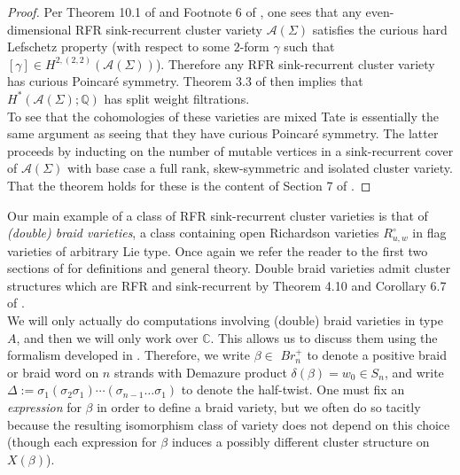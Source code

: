\documentclass[11pt]{amsart}
\theoremstyle{definition}
\theoremstyle{remark}
\numberwithin{equation}{section}
\begin{document}
\begin{proof}
Per Theorem 10.1 of \cite{galashin2022braid} and Footnote 6 of \cite{galashin2026braid}, one sees that any even-dimensional RFR sink-recurrent cluster variety $\mathcal{A}(\Sigma)$ satisfies the curious hard Lefschetz property (with respect to some $2$-form $\gamma$ such that $[\gamma] \in H^{2, (2, 2)}(\mathcal{A}(\Sigma))$). Therefore any RFR sink-recurrent cluster variety has curious Poincar\'e symmetry. Theorem 3.3 of \cite{lam2022cohomology} then implies that $H^*(\mathcal{A}(\Sigma); \mathbb{Q})$ has split weight filtrations.\\

To see that the cohomologies of these varieties are mixed Tate is essentially the same argument as seeing that they have curious Poincar\'e symmetry. The latter proceeds by inducting on the number of mutable vertices in a sink-recurrent cover of $\mathcal{A}(\Sigma)$ with base case a full rank, skew-symmetric and isolated cluster variety. That the theorem holds for these is the content of Section 7 of \cite{lam2022cohomology}.
\end{proof}

Our main example of a class of RFR sink-recurrent cluster varieties is that of \textit{(double) braid varieties}, a class containing open Richardson varieties $R_{u,w}^\circ$ in flag varieties of arbitrary Lie type. Once again we refer the reader to the first two sections of \cite{galashin2026braid} for definitions and general theory. Double braid varieties admit cluster structures which are RFR and sink-recurrent by Theorem 4.10 and Corollary 6.7 of \cite{galashin2026braid}.\\

We will only actually do computations involving (double) braid varieties in type $A$, and then we will only work over $\mathbb{C}$. This allows us to discuss them using the formalism developed in \cite{MR4868947}. Therefore, we write $\beta \in$ $Br_n^+$ to denote a positive braid or braid word on $n$ strands with Demazure product $\delta(\beta) = w_0 \in S_n$, and write $\Delta := \sigma_1(\sigma_2 \sigma_1)\cdots(\sigma_{n-1}\dots \sigma_1)$ to denote the half-twist. One must fix an \textit{expression} for $\beta$ in order to define a braid variety, but we often do so tacitly because the resulting isomorphism class of variety does not depend on this choice (though each expression for $\beta$ induces a possibly different cluster structure on $X(\beta)$).\\
\end{document}
